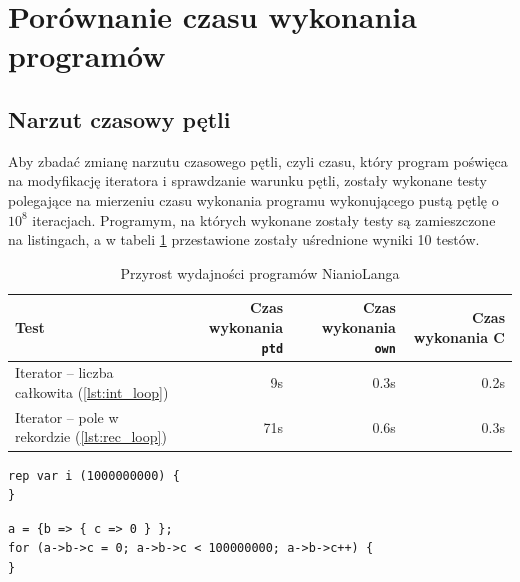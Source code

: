 \documentclass[licencjacka]{pracamgr}
\begin{document}
\section{Porównanie czasu wykonania programów}
\subsection{Narzut czasowy pętli}
Aby zbadać zmianę narzutu czasowego pętli, czyli czasu, który program poświęca na modyfikację iteratora i sprawdzanie
warunku pętli, zostały wykonane testy polegające na mierzeniu czasu wykonania programu wykonującego pustą pętlę
o $10^8$ iteracjach. Programym, na których wykonane zostały testy są zamieszczone na listingach, a w tabeli
\ref{tab:loop}
przestawione zostały uśrednione wyniki 10 testów.

\begin{table}[t]
\caption{Przyrost wydajności programów NianioLanga}
\label{tab:loop}
\begin{tabular}{|l|r|r|r|}
 \hline 
  Test & Czas wykonania \texttt{ptd} & Czas wykonania \texttt{own} & Czas wykonania C\\
 \hline 
  Iterator -- liczba całkowita (\ref{lst:int_loop}) & 9s & 0.3s & 0.2s \\
  \hline
  Iterator -- pole w rekordzie (\ref{lst:rec_loop}) & 71s & 0.6s & 0.3s \\
  \hline
\end{tabular}
\end{table}
\begin{lstlisting}[caption={Iterator całkowitoliczbowy},label={lst:int_loop}]
rep var i (1000000000) {
}
\end{lstlisting}
\begin{lstlisting}[caption={Iterator będący polem rekordu},label={lst:rec_loop}]
a = {b => { c => 0 } };
for (a->b->c = 0; a->b->c < 100000000; a->b->c++) {
}
\end{lstlisting}
\end{document}
